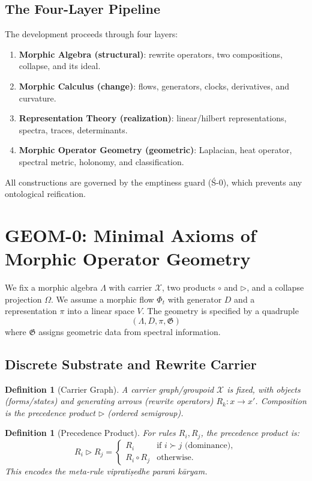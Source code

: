 \documentclass[12pt, oneside]{article}
\newtheorem{definition}[theorem]{Definition}
\begin{document}
\subsection{The Four-Layer Pipeline}

The development proceeds through four layers:

\begin{enumerate}
    \item \textbf{Morphic Algebra (structural)}: rewrite operators, two compositions, collapse, and its ideal.
    \item \textbf{Morphic Calculus (change)}: flows, generators, clocks, derivatives, and curvature.
    \item \textbf{Representation Theory (realization)}: linear/hilbert representations, spectra, traces, determinants.
    \item \textbf{Morphic Operator Geometry (geometric)}: Laplacian, heat operator, spectral metric, holonomy, and classification.
\end{enumerate}

All constructions are governed by the emptiness guard (Ś-0), which prevents any ontological reification.

\section{GEOM-0: Minimal Axioms of Morphic Operator Geometry}

We fix a morphic algebra $\Lambda$ with carrier $\mathcal{X}$, two products $\circ$ and $\triangleright$, and a collapse projection $\Omega$. We assume a morphic flow $\Phi_t$ with generator $D$ and a representation $\pi$ into a linear space $V$. The geometry is specified by a quadruple
\[
(\Lambda, D, \pi, \mathfrak{G})
\]
where $\mathfrak{G}$ assigns geometric data from spectral information.

\subsection{Discrete Substrate and Rewrite Carrier}

\begin{definition}[Carrier Graph]
A carrier graph/groupoid $\mathcal{X}$ is fixed, with objects (forms/states) and generating arrows (rewrite operators) $R_k: x \to x'$. Composition is the precedence product $\triangleright$ (ordered semigroup).
\end{definition}

\begin{definition}[Precedence Product]
For rules $R_i, R_j$, the precedence product is:
\[
R_i \triangleright R_j = 
\begin{cases}
R_i & \text{if } i \succ j \text{ (dominance)},\\
R_i \circ R_j & \text{otherwise}.
\end{cases}
\]
This encodes the meta-rule \emph{vipratiṣedhe paraṁ kāryam}.
\end{definition}
\end{document}
